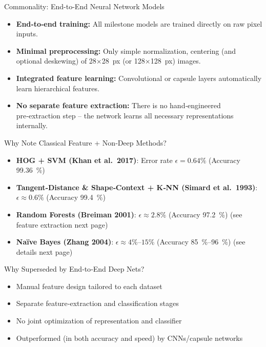 \documentclass[german,10pt]{beamer}
\begin{document}
\begin{frame}{Commonality: End-to-End Neural Network Models}
  \begin{itemize}
    \item \textbf{End‑to‑end training:}  
      All milestone models are trained directly on raw pixel inputs.
    \item \textbf{Minimal preprocessing:}  
      Only simple normalization, centering (and optional deskewing) of 28×28 px (or 128×128 px) images.
    \item \textbf{Integrated feature learning:}  
      Convolutional or capsule layers automatically learn hierarchical features.
    \item \textbf{No separate feature extraction:}  
      There is no hand‑engineered pre‑extraction step – the network learns all necessary representations internally.
  \end{itemize}
\end{frame}

\begin{frame}{Why Note Classical Feature + Non‑Deep Methods?}
  \begin{itemize}
    \item \textbf{HOG + SVM (Khan et al.\ 2017)}:  
      Error rate $\epsilon = 0.64\%$ (Accuracy 99.36 \%) \cite{Khan2017}
    \item \textbf{Tangent‑Distance \& Shape‑Context + K‑NN (Simard et al.\ 1993)}:  
      $\epsilon \approx 0.6\%$ (Accuracy 99.4 \%) \cite{Simard1993}
    \item \textbf{Random Forests (Breiman 2001)}:  
      $\epsilon \approx 2.8\%$ (Accuracy 97.2 \%) \cite{Breiman2001} \small{(see feature extraction next page)}
    \item \textbf{Naïve Bayes (Zhang 2004)}:  
      $\epsilon \approx 4\%–15\%$ (Accuracy 85 \%–96 \%) \cite{Zhang2004} \small{(see details next page)}
  \end{itemize}
  \vspace{0.8em}
  \begin{block}{Why Superseded by End‑to‑End Deep Nets?}
    \begin{itemize}
      \item Manual feature design tailored to each dataset
      \item Separate feature‑extraction and classification stages
      \item No joint optimization of representation and classifier
      \item Outperformed (in both accuracy and speed) by CNNs/capsule networks
    \end{itemize}
  \end{block}
\end{frame}
\end{document}
